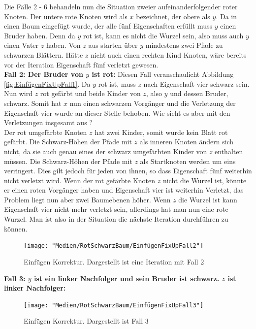 \documentclass[a4paper,12pt]{article}
\begin{document}
\noindent Die Fälle 2 - 6 behandeln nun die Situation zweier aufeinanderfolgender roter Knoten. Der untere rote Knoten wird als $x$ bezeichnet, der obere als $y$. Da in einen Baum eingefügt wurde, der alle fünf Eigenschaften erfüllt muss $y$ einen Bruder haben.  Denn da $y$ rot ist, kann es nicht die Wurzel sein, also muss auch $y$ einen Vater $z$ haben. Von $z$ aus starten über $y$ mindestens zwei Pfade zu schwarzen Blättern. Hätte $z$ nicht auch einen rechten Kind Knoten, wäre bereits vor der Iteration Eigenschaft fünf verletzt gewesen.  \\
\noindent\textbf{Fall 2: Der Bruder von $y$ ist rot: }
\noindent Diesen Fall veranschaulicht Abbildung \ref{fig:EinfügenFixUpFall1}. Da $y$ rot ist, muss $z$ nach Eigenschaft vier schwarz sein. Nun wird $z$ rot gefärbt und beide Kinder von $z$, also $y$ und dessen Bruder, schwarz. Somit hat $x$ nun einen schwarzen Vorgänger und die Verletzung der Eigenschaft vier wurde an dieser Stelle behoben. Wie sieht es aber mit den Verletzungen insgesamt aus ? \\
Der rot umgefärbte Knoten $z$ hat zwei Kinder, somit wurde kein Blatt rot gefärbt. Die Schwarz-Höhen der Pfade mit $z$ als inneren Knoten ändern sich nicht, da sie auch genau eines der schwarz umgefärbten Kinder von $z$ enthalten müssen. Die Schwarz-Höhen der Pfade mit $z$ als Startknoten werden um eins verringert. Dies gilt jedoch für jeden von ihnen, so dass Eigenschaft fünf weiterhin nicht verletzt wird. Wenn der rot gefärbte Knoten $z$ nicht die Wurzel ist, könnte er einen roten Vorgänger haben und Eigenschaft vier ist weiterhin Verletzt, das Problem liegt nun aber zwei Baumebenen höher. Wenn $z$ die Wurzel ist kann Eigenschaft vier nicht mehr verletzt sein, allerdings hat man nun eine rote Wurzel. Man ist also in der Situation die nächste Iteration durchführen zu können.\\
\begin{figure}[h]
	\centering
	\texttt{[image: "Medien/RotSchwarzBaum/EinfügenFixUpFall2"]}
	\caption{Einfügen Korrektur. Dargestellt ist eine Iteration mit Fall 2  }
	\label{fig:EinfügenFixUpFall2}
\end{figure}

\noindent\textbf{Fall 3: $y$ ist ein linker Nachfolger und sein Bruder ist schwarz. $z$ ist linker Nachfolger: }

     


\begin{figure}[h]
	\centering
	\texttt{[image: "Medien/RotSchwarzBaum/EinfügenFixUpFall3"]}
	\caption{Einfügen Korrektur. Dargestellt ist Fall 3  }
	\label{fig:EinfügenFixUpFall3}
\end{figure}
\end{document}
